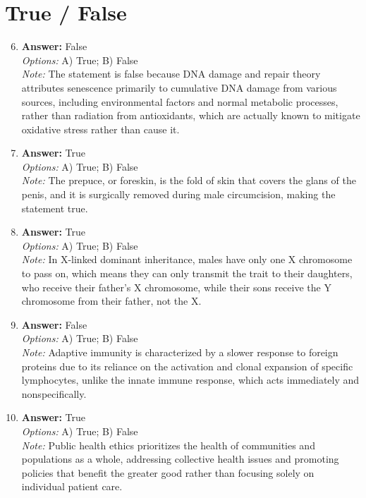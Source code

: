 \documentclass[12pt]{article}
\begin{document}
\section*{True / False}
\begin{enumerate}[label=\arabic*.]
\setcounter{enumi}{5}
\item \textbf{Answer:} False
\\ \textit{Options:} A) True; B) False
\\ \textit{Note:} The statement is false because DNA damage and repair theory attributes senescence primarily to cumulative DNA damage from various sources, including environmental factors and normal metabolic processes, rather than radiation from antioxidants, which are actually known to mitigate oxidative stress rather than cause it.
\item \textbf{Answer:} True
\\ \textit{Options:} A) True; B) False
\\ \textit{Note:} The prepuce, or foreskin, is the fold of skin that covers the glans of the penis, and it is surgically removed during male circumcision, making the statement true.
\item \textbf{Answer:} True
\\ \textit{Options:} A) True; B) False
\\ \textit{Note:} In X-linked dominant inheritance, males have only one X chromosome to pass on, which means they can only transmit the trait to their daughters, who receive their father's X chromosome, while their sons receive the Y chromosome from their father, not the X.
\item \textbf{Answer:} False
\\ \textit{Options:} A) True; B) False
\\ \textit{Note:} Adaptive immunity is characterized by a slower response to foreign proteins due to its reliance on the activation and clonal expansion of specific lymphocytes, unlike the innate immune response, which acts immediately and nonspecifically.
\item \textbf{Answer:} True
\\ \textit{Options:} A) True; B) False
\\ \textit{Note:} Public health ethics prioritizes the health of communities and populations as a whole, addressing collective health issues and promoting policies that benefit the greater good rather than focusing solely on individual patient care.
\end{enumerate}
\end{document}
